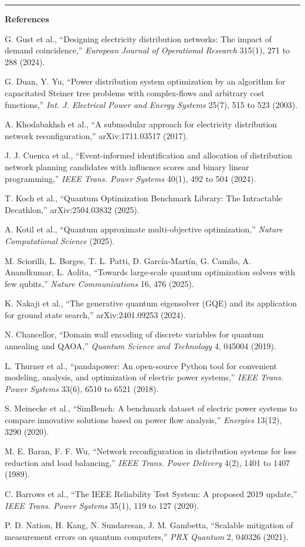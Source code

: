 \documentclass[10pt,a4paper]{article}
\begin{document}
\vspace{4pt}
\hrule
\vspace{3pt}
{\color{eon}\bfseries References}
\begin{enumerate}[label={[\arabic*]},leftmargin=2em,itemsep=0pt]
\item G. Gust et al., ``Designing electricity
distribution networks: The impact of demand coincidence,'' \emph{European
Journal of Operational Research} 315(1), 271 to 288 (2024).
\item G. Duan, Y. Yu, ``Power distribution system optimization by an algorithm
for capacitated Steiner tree problems with complex-flows and arbitrary cost
functions,'' \emph{Int. J. Electrical Power and Energy Systems} 25(7), 515 to
523 (2003).
\item A. Khodabakhsh et al., ``A submodular approach for electricity
distribution network reconfiguration,'' arXiv:1711.03517 (2017).
\item J. J. Cuenca et al., ``Event-informed identification and allocation of
distribution network planning candidates with influence scores and binary
linear programming,'' \emph{IEEE Trans. Power Systems} 40(1), 492 to 504
(2024).
\item T. Koch et al., ``Quantum Optimization Benchmark Library: The
Intractable Decathlon,'' arXiv:2504.03832 (2025).
\item A. Kotil et al., ``Quantum approximate multi-objective optimization,''
\emph{Nature Computational Science} (2025).
\item M. Sciorilli, L. Borges, T. L. Patti, D. Garc\'ia-Mart\'in, G. Camilo,
A. Anandkumar, L. Aolita, ``Towards large-scale quantum optimization solvers
with few qubits,'' \emph{Nature Communications} 16, 476 (2025).
\item K. Nakaji et al., ``The generative quantum eigensolver (GQE) and its
application for ground state search,'' arXiv:2401.09253 (2024).
\item N. Chancellor, ``Domain wall encoding of discrete variables for quantum
annealing and QAOA,'' \emph{Quantum Science and Technology} 4, 045004 (2019).
\item L. Thurner et al., ``pandapower: An open-source Python tool for
convenient modeling, analysis, and optimization of electric power systems,''
\emph{IEEE Trans. Power Systems} 33(6), 6510 to 6521 (2018).
\item S. Meinecke et al., ``SimBench: A benchmark dataset of electric power
systems to compare innovative solutions based on power flow analysis,''
\emph{Energies} 13(12), 3290 (2020).
\item M. E. Baran, F. F. Wu, ``Network reconfiguration in distribution
systems for loss reduction and load balancing,'' \emph{IEEE Trans. Power
Delivery} 4(2), 1401 to 1407 (1989).
\item C. Barrows et al., ``The IEEE Reliability Test System: A proposed 2019
update,'' \emph{IEEE Trans. Power Systems} 35(1), 119 to 127 (2020).
\item P. D. Nation, H. Kang, N. Sundaresan, J. M. Gambetta, ``Scalable
mitigation of measurement errors on quantum computers,'' \emph{PRX Quantum}
2, 040326 (2021).
\end{enumerate}
\end{document}
